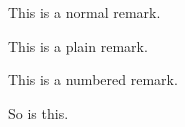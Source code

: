 \begin{remark-click}
This is a normal remark.
\end{remark-click}

\begin{remark-click}
{\rm This is a plain remark.}
\end{remark-click}

\begin{remark-click-numbered}
This is a numbered remark.
\end{remark-click-numbered}
\begin{remark-click-numbered}
So is this.
\end{remark-click-numbered}
